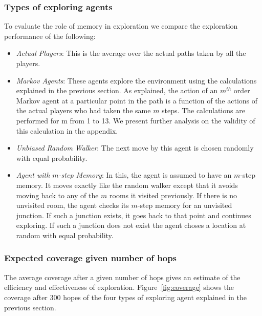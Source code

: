 \subsubsection{Types of exploring agents}
\label{sec:types_of_data}

To evaluate the role of memory in exploration we compare the exploration performance of the following:
\begin{itemize}
    \item \emph{Actual Players}: This is the average over the actual paths taken by all the players.

    \item \emph{Markov Agents}: These agents explore the environment using the calculations explained in the previous section. As explained, the action of an $m^{th}$ order Markov agent at a particular point in the path is a function of the actions of the actual players who had taken the same $m$ steps. The calculations are performed for m from 1 to 13. We present further analysis on the validity of this calculation in the appendix.

    \item \emph{Unbiased Random Walker}:  The next move by this agent is chosen randomly with equal probability.

    \item \emph{Agent with $m$-step Memory}: In this, the agent is assumed to have an $m$-step memory. It moves exactly like the random walker except that it avoids moving back to any of the $m$ rooms it visited previously. If there is no unvisited room, the agent checks its $m$-step memory for an unvisited junction. If such a junction exists, it goes back to that point and continues exploring. If such a junction does not exist the agent choses a location at random with equal probability.

\end{itemize}


\subsubsection{Expected coverage given number of hops} %
\label{sec:calculation_4_expected_coverage_given_number_of_hops}

The average coverage after a given number of hops gives an estimate of the efficiency and effectiveness of exploration. Figure~\ref{fig:coverage} shows the coverage after 300 hopes of the four types of exploring agent explained in the previous section.


